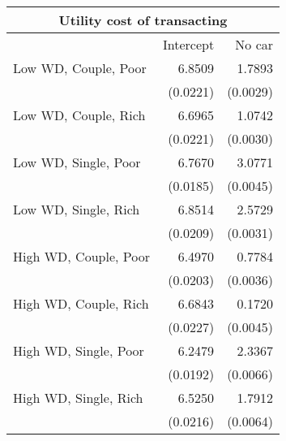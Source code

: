 \begin{tabular}{lrr} 
\toprule 
\multicolumn{3}{c}{Utility cost of transacting} \\ 
\midrule
                                &    Intercept   &       No car  \\ 
\midrule 
          Low WD, Couple, Poor  &       6.8509   &       1.7893  \\ 
                                & (0.0221)   & (0.0029)  \\ 
          Low WD, Couple, Rich  &       6.6965   &       1.0742  \\ 
                                & (0.0221)   & (0.0030)  \\ 
          Low WD, Single, Poor  &       6.7670   &       3.0771  \\ 
                                & (0.0185)   & (0.0045)  \\ 
          Low WD, Single, Rich  &       6.8514   &       2.5729  \\ 
                                & (0.0209)   & (0.0031)  \\ 
         High WD, Couple, Poor  &       6.4970   &       0.7784  \\ 
                                & (0.0203)   & (0.0036)  \\ 
         High WD, Couple, Rich  &       6.6843   &       0.1720  \\ 
                                & (0.0227)   & (0.0045)  \\ 
         High WD, Single, Poor  &       6.2479   &       2.3367  \\ 
                                & (0.0192)   & (0.0066)  \\ 
         High WD, Single, Rich  &       6.5250   &       1.7912  \\ 
                                & (0.0216)   & (0.0064)  \\ 
\bottomrule \end{tabular} 
